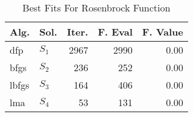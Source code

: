 \begin{table}
\centering
\caption{Best Fits For Rosenbrock Function}
\label{solutions:rosenbrock30d}
\begin{tabular}{llrrr}
\toprule
 Alg. &    Sol. &  Iter. &  F. Eval &  F. Value \\
\midrule
  dfp & $S_{1}$ &   2967 &     2990 &      0.00 \\
 bfgs & $S_{2}$ &    236 &      252 &      0.00 \\
lbfgs & $S_{3}$ &    164 &      406 &      0.00 \\
  lma & $S_{4}$ &     53 &      131 &      0.00 \\
\bottomrule
\end{tabular}
\end{table}
